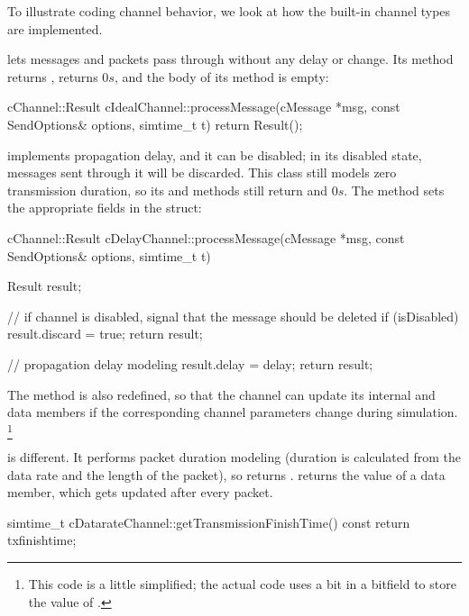 To illustrate coding channel behavior, we look at how the built-in channel
types are implemented.

 lets messages and packets pass through without
any delay or change. Its  method returns
,  returns $0s$, and the
body of its  method is empty:

\begin{cpp}
cChannel::Result cIdealChannel::processMessage(cMessage *msg,
                    const SendOptions& options, simtime_t t)
{
    return Result();
}
\end{cpp}

 implements propagation delay, and it can be
disabled; in its disabled state, messages sent through it will be discarded.
This class still models zero transmission duration, so its
 and 
methods still return  and $0s$. The  method
sets the appropriate fields in the  struct:


\begin{cpp}
cChannel::Result cDelayChannel::processMessage(cMessage *msg,
                    const SendOptions& options, simtime_t t)
{
    Result result;

    // if channel is disabled, signal that the message should be deleted
    if (isDisabled) {
        result.discard = true;
        return result;
    }

    // propagation delay modeling
    result.delay = delay;
    return result;
}
\end{cpp}

The  method is also redefined, so that
the channel can update its internal  and 
data members if the corresponding channel parameters change during simulation.
\footnote{This code is a little simplified; the actual code uses a bit
in a bitfield to store the value of .}

 is different. It performs packet duration modeling
(duration is calculated from the data rate and the length of the packet),
so  returns .
 returns the value of a 
data member, which gets updated after every packet.

\begin{cpp}
simtime_t cDatarateChannel::getTransmissionFinishTime() const
{
    return txfinishtime;
}
\end{cpp}

